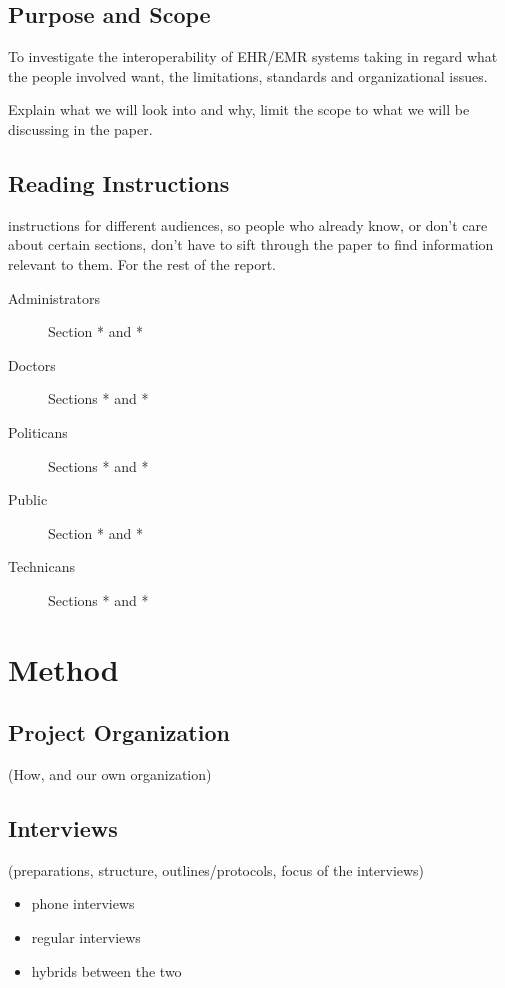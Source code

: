 \documentclass[12pt]{article}
\begin{document}
\subsection{Purpose and Scope}
To investigate the interoperability of
EHR/EMR systems taking in regard what
the people involved want, the limitations,
standards and organizational issues.

Explain what we will look into and why, limit the scope to what we will be discussing in the paper.

\subsection{Reading Instructions}
instructions for different audiences, so people who already know, or don't care about certain sections, don't have to sift through the paper to find information relevant to them. For the rest of the report.

\begin{description}
\item[Administrators] Section * and *
\item[Doctors] Sections * and *
\item[Politicans] Sections * and *
\item[Public] Section * and *
\item[Technicans] Sections * and *
\end{description}

\newpage

\section{Method}

\subsection{Project Organization}
 (How, and our own organization)

\subsection{Interviews}
(preparations, structure, outlines/protocols, focus of the interviews)
\begin{itemize}
\item phone interviews
\item regular interviews
\item hybrids between the two
\end{itemize}
\end{document}
